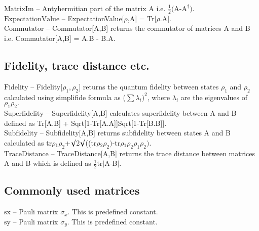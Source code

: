 \noindent\textbf{$ \text{MatrixIm} $ }-- Antyhermitian part of the matrix A i.e. $ \frac{1}{2}\text{(A-A} ^{\dagger }\text{).} $\\

\noindent\textbf{$ \text{ExpectationValue} $ }-- ExpectationValue[$\rho $,A] = Tr[$\rho $.A].$  $\\

\noindent\textbf{$ \text{Commutator} $ }-- Commutator[A,B] returns the commutator of matrices A and B i.e. Commutator[A,B] = A.B - B.A.$  $\\

\subsection{Fidelity, trace distance etc.}

\noindent\textbf{$ \text{Fidelity} $ }-- Fidelity[$ \rho _1,\rho _2 $] returns the quantum fidelity between states $ \rho _1 $ and $ \rho _2 $ calculated using simplifide formula as ($\sum $$ \lambda _i)^2 $, where $ \lambda _i $ are the eigenvalues of $ \rho _1\rho _2. $\\

\noindent\textbf{$ \text{Superfidelity} $ }-- Superfidelity[A,B] calculates superfidelity between A and B defined as Tr[A.B] + Sqrt[1-Tr[A.A]]Sqrt[1-Tr[B.B]].$  $\\

\noindent\textbf{$ \text{Subfidelity} $ }-- Subfidelity[A,B] returns subfidelity between states A and B calculated as $  $tr$\rho $$ _1\rho _2 $+$\surd $2$\surd $(($  $tr$\rho $$ _2\rho _2\text{)-} $tr$\rho $$ _1\rho _2\rho _1\rho _2\text{).} $\\

\noindent\textbf{$ \text{TraceDistance} $ }-- TraceDistance[A,B] returns the trace distance between matrices A and B which is defined as $ \frac{1}{2} $tr$|$A-B$|$.$  $\\

\subsection{Commonly used matrices}

\noindent\textbf{$ \text{sx} $ }-- Pauli matrix $ \sigma _x $. This is predefined constant.$  $\\

\noindent\textbf{$ \text{sy} $ }-- Pauli matrix $ \sigma _y $. This is predefined constant.$  $\\

